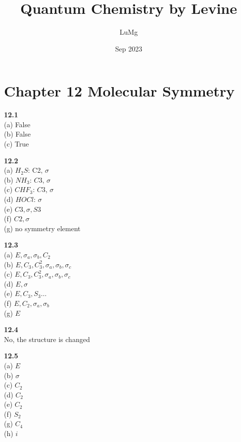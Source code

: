 \documentclass{article}
\title{Quantum Chemistry by Levine}
\author{LuMg}
\date{Sep 2023}
\begin{document}
\maketitle

\section{Chapter 12 Molecular Symmetry}
\textbf{12.1}\\
(a) False\\
(b) False\\
(c) True\\
\newline

\textbf{12.2}\\
(a) $H_2S$: C2, $\sigma$\\
(b) $NH_3$: $C3$, $\sigma$\\
(c) $CHF_3$: $C3$, $\sigma$\\
(d) $HOCl$: $\sigma$\\
(e) $C3,\sigma,S3$\\
(f) $C2,\sigma$\\
(g) no symmetry element\\
\newline

\textbf{12.3}\\
(a) $E, \sigma_a, \sigma_b, C_2$\\
(b) $E, C_3, C_3^2, \sigma_a, \sigma_b, \sigma_c$\\
(c) $E, C_3, C_3^2, \sigma_a, \sigma_b, \sigma_c$\\
(d) $E, \sigma$\\
(e) $E, C_3, S_3 \dots$\\
(f) $E, C_2, \sigma_a, \sigma_b$\\
(g) $E$\\
\newline

\textbf{12.4}\\
No, the structure is changed\\
\newline

\textbf{12.5}\\
(a) $E$\\
(b) $\sigma$\\
(c) $C_2$\\
(d) $C_2$\\
(e) $C_2$\\
(f) $S_2$\\
(g) $C_4$\\
(h) $i$\\
\newline
\end{document}
